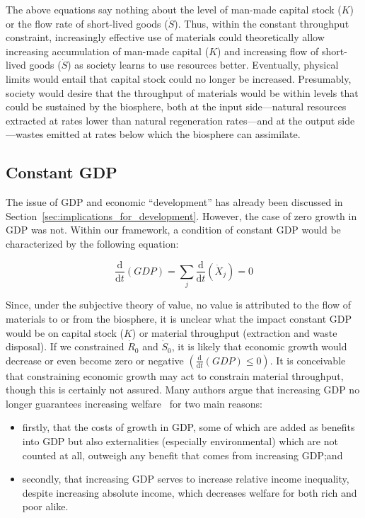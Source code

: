The above equations say nothing about the level 
of man-made capital stock ($K$)
or the flow rate of short-lived goods ($\dot{S}$).
Thus, within the constant throughput constraint,
increasingly effective use of materials could
theoretically allow increasing accumulation
of man-made capital ($K$) 
and increasing flow of short-lived goods ($\dot{S}$)
as society learns to use resources better.
Eventually,
physical limits would entail that capital
stock could no longer be increased.
Presumably,
society would desire that the throughput of
materials would be within levels that could
be sustained by the biosphere,
both at the input side---natural 
resources extracted at rates lower
than natural regeneration rates---and 
at the output side---wastes emitted 
at rates below which
the biosphere can assimilate.


\subsection{Constant GDP}

The issue of GDP and economic ``development'' 
has already been discussed in 
Section~\ref{sec:implications_for_development}. 
However,
the case of zero growth in GDP was not.
Within our framework,
a condition of constant GDP would be
characterized by the following equation:

\begin{equation}\label{eq:const_GDP}
	\frac{\mathrm{d}}{\mathrm{d}t}\left(GDP\right)
	=	\sum\limits_{j}\frac{\mathrm{d}}{\mathrm{d}t}\left(\dot{X}_{j}\right)
	= 0
\end{equation}

Since,
under the subjective theory of value,
no value is attributed to the flow of materials
to or from the biosphere,
it is unclear what the impact constant GDP would be
on capital stock ($K$)
or material throughput
(extraction and waste disposal).
If we constrained $\dot{R}_{0}$ and
$\dot{S}_{0}$, 
it is likely that economic growth would 
decrease or even become zero or negative
$\left(\frac{\mathrm{d}}{\mathrm{d}t}\left(GDP\right) \leq 0\right)$.
It is conceivable that constraining
economic growth may act to constrain
material throughput,
though this is certainly not assured.
Many authors argue that increasing GDP
no longer guarantees increasing welfare~\cite{G-R1975a, Wackernagel1996,
Cobb1999, Daly2006, Costanza2014} 
for two main reasons:
\begin{itemize}
	\item firstly, that the costs of growth in GDP, 
	some of which are added as benefits into GDP 
	but also externalities (especially environmental) 
	which are not counted at all, outweigh any benefit 
	that comes from increasing GDP;\@ and
	\item secondly, that increasing GDP serves to
	increase relative income inequality,
	despite increasing absolute income,
	which decreases welfare for both rich and poor 
	alike.\cite{Daly2006}
\end{itemize}


